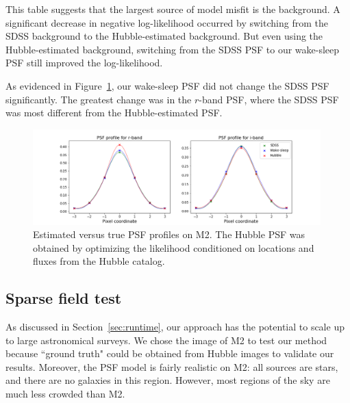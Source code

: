 This table suggests that the largest source of model misfit is the background. A significant decrease in negative log-likelihood occurred by switching from the SDSS background to the Hubble-estimated background. 
But even using the Hubble-estimated background, switching from the SDSS PSF to our wake-sleep PSF still improved the log-likelihood. 



As evidenced in Figure~\ref{fig:psf_profiles}, our wake-sleep PSF did not change the SDSS PSF significantly. The greatest change was in the $r$-band PSF, where the SDSS PSF was most different from the Hubble-estimated PSF. 

\begin{figure}[ht]
    \centering
    \includegraphics[width=0.99\textwidth]{figures/psf_profiles.png}
    \caption{Estimated versus true PSF profiles on M2. The Hubble PSF was
    obtained by optimizing the likelihood conditioned on locations and fluxes
    from the Hubble catalog. }
    \label{fig:psf_profiles}
\end{figure}



\subsection{Sparse field test}
As discussed in Section~\ref{sec:runtime}, our approach has the potential 
to scale up to large astronomical surveys. We chose the image of M2 to test our method because ``ground truth" could be obtained from Hubble images to validate our results. Moreover, 
the PSF model is fairly realistic on M2: all sources are 
stars, and there are no galaxies in this region. 
However, most regions of the sky are much less 
crowded than M2.


